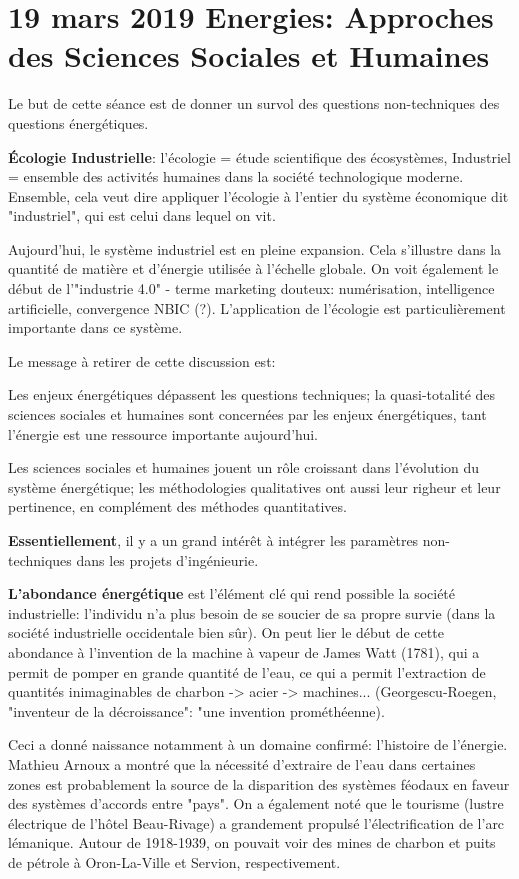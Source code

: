 \documentclass{article}
\begin{document}
\section{19 mars 2019 Energies: Approches des Sciences Sociales et Humaines}
Le but de cette séance est de donner un survol des questions non-techniques des questions énergétiques. \par
\textbf{Écologie Industrielle}: l'écologie = étude scientifique des écosystèmes, Industriel = ensemble des activités humaines dans la société technologique moderne. Ensemble, cela veut dire appliquer l'écologie à l'entier du système économique dit "industriel", qui est celui dans lequel on vit. \par
 Aujourd'hui, le système industriel est en pleine expansion. Cela s'illustre dans la quantité de matière et d'énergie utilisée à l'échelle globale. On voit également le début de l'"industrie 4.0" - terme marketing douteux: numérisation, intelligence artificielle, convergence NBIC (?). L'application de l'écologie est particulièrement importante dans ce système. \par
 Le message à retirer de cette discussion est:
 \begin{center}
 	Les enjeux énergétiques dépassent les questions techniques; la quasi-totalité des sciences sociales et humaines sont concernées par les enjeux énergétiques, tant l'énergie est une ressource importante aujourd'hui. \par
 	Les sciences sociales et humaines jouent un rôle croissant dans l'évolution du système énergétique; les méthodologies qualitatives ont aussi leur righeur et leur pertinence, en complément des méthodes quantitatives. \par
 	\textbf{Essentiellement}, il y a un grand intérêt à intégrer les paramètres non-techniques dans les projets d'ingénieurie.
 \end{center}
 \textbf{L'abondance énergétique} est l'élément clé qui rend possible la société industrielle: l'individu n'a plus besoin de se soucier de sa propre survie (dans la société industrielle occidentale bien sûr). On peut lier le début de cette abondance à l'invention de la machine à vapeur de James Watt (1781), qui a permit de pomper en grande quantité de l'eau, ce qui a permit l'extraction de quantités inimaginables de charbon -> acier -> machines... (Georgescu-Roegen, "inventeur de la décroissance": "une invention prométhéenne). \par
 Ceci a donné naissance notamment à un domaine confirmé: l'histoire de l'énergie. Mathieu Arnoux a montré que la nécessité d'extraire de l'eau dans certaines zones est probablement la source de la disparition des systèmes féodaux en faveur des systèmes d'accords entre "pays". On a également noté que le tourisme (lustre électrique de l'hôtel Beau-Rivage) a grandement propulsé l'électrification de l'arc lémanique. Autour de 1918-1939, on pouvait voir des mines de charbon et puits de pétrole à Oron-La-Ville et Servion, respectivement. \par
\end{document}
